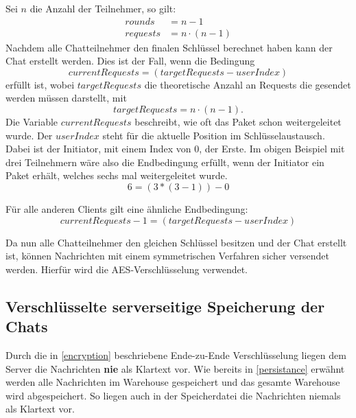 Sei $n$ die Anzahl der Teilnehmer, so gilt:
\[
\begin{split}
  rounds &= n - 1\\
  requests &= n \cdot (n - 1)  
\end{split}
\]
Nachdem alle Chatteilnehmer den finalen Schlüssel berechnet haben kann der Chat erstellt werden. Dies ist der Fall,
wenn die Bedingung $$ currentRequests = (targetRequests - userIndex) $$ erfüllt ist, wobei $targetRequests$ die theoretische Anzahl
an Requests die gesendet werden müssen darstellt, mit $$targetRequests = n \cdot (n-1).$$
Die Variable $currentRequests$ beschreibt, wie oft das Paket schon weitergeleitet wurde.
Der $userIndex$ steht für die aktuelle Position im Schlüsselaustausch. Dabei ist der Initiator, mit einem Index von 0, der Erste.
Im obigen Beispiel mit drei Teilnehmern wäre also die Endbedingung erfüllt, wenn der Initiator ein Paket erhält, 
welches sechs mal weitergeleitet wurde.
$$ 6 = (3 * (3 - 1)) - 0 $$



Für alle anderen Clients gilt eine ähnliche Endbedingung: $$ currentRequests - 1 = (targetRequests - userIndex) $$

Da nun alle Chatteilnehmer den gleichen Schlüssel besitzen und der Chat erstellt ist, können Nachrichten mit 
einem symmetrischen Verfahren sicher versendet werden. Hierfür wird die AES-Verschlüsselung verwendet.

\author{Troy Keßler}
\subsection{Verschlüsselte serverseitige Speicherung der Chats}
Durch die in \ref{encryption} beschriebene Ende-zu-Ende Verschlüsselung liegen dem Server die Nachrichten \textbf{nie} als Klartext vor.
Wie bereits in \ref{persistance} erwähnt werden alle Nachrichten im Warehouse gespeichert und das gesamte Warehouse wird abgespeichert.
So liegen auch in der Speicherdatei die Nachrichten niemals als Klartext vor.
